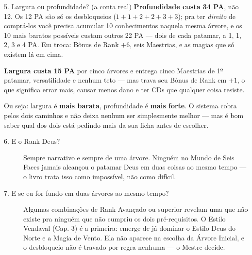 \begin{aviso}{5. Largura ou profundidade? (a conta real)}
    \textbf{Profundidade custa 34 PA}, não 12. Os 12 PA são só os desbloqueios
    ($1+1+2+2+3+3$); pra ter \emph{direito} de comprá-los você precisa acumular 10
    conhecimentos naquela mesma árvore, e os 10 mais baratos possíveis custam outros 22 PA
    --- dois de cada patamar, a 1, 1, 2, 3 e 4 PA. Em troca: Bônus de Rank $+6$, seis
    Maestrias, e as magias que só existem lá em cima.

    \medskip
    \textbf{Largura custa 15 PA} por cinco árvores e entrega cinco Maestrias de 1º patamar,
    versatilidade e nenhum teto --- mas trava seu Bônus de Rank em $+1$, o que significa
    errar mais, causar menos dano e ter CDs que qualquer coisa resiste.

    \medskip
    Ou seja: largura é \textbf{mais barata}, profundidade é \textbf{mais forte}. O sistema
    cobra pelos dois caminhos e não deixa nenhum ser simplesmente melhor --- mas é bom saber
    qual dos dois está pedindo mais da sua ficha antes de escolher.
\end{aviso}

\begin{description}
    \item[6. E o Rank Deus?] Sempre narrativo e sempre de uma árvore. Ninguém no Mundo de
          Seis Faces jamais alcançou o patamar Deus em duas coisas ao mesmo tempo --- o
          livro trata isso como impossível, não como difícil.

    \item[7. E se eu for fundo em duas árvores ao mesmo tempo?] Algumas combinações de Rank
          Avançado ou superior revelam uma  que não existe pra
          ninguém que não cumpriu os dois pré-requisitos. O Estilo Vendaval (Cap. 3) é a
          primeira: emerge de já dominar o Estilo Deus do Norte e a Magia de Vento. Ela não
          aparece na escolha da Árvore Inicial, e o desbloqueio não é travado por regra
          nenhuma --- o Mestre decide.
\end{description}
